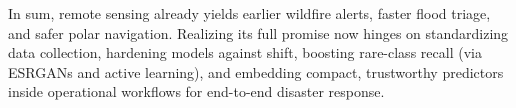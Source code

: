 \documentclass[conference,a4paper]{IEEEtran}
\begin{document}
In sum, remote sensing already yields earlier wildfire alerts, faster flood triage, and safer polar navigation. Realizing its full promise now hinges on standardizing data collection, hardening models against shift, boosting rare-class recall (via ESRGANs and active learning), and embedding compact, trustworthy predictors inside operational workflows for end-to-end disaster response.



  
\end{document}
